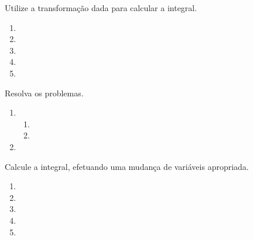 



	
	
	\vspace{5mm}
	
	Utilize a transformação dada para calcular a integral.
	
	\begin{enumerate}
		
		\item 
		\resposta{}
		
		\item 
		\resposta{}
		
		\item 
		\resposta{}
		
		\item 
		\resposta{}
		
		\item 
		\resposta{}
	
	\end{enumerate}
	
	\vspace{5mm}
	
	Resolva os problemas.
	
	\begin{enumerate}[resume]
		
		\item \begin{enumerate}

			\item 
			\resposta{}
			
			\item
			\resposta{}
			
		\end{enumerate}
		
		\item 
		\resposta{}
		
	\end{enumerate}
	
	\vspace{5mm}
	
	Calcule a integral, efetuando uma mudança de variáveis apropriada.
	
	\begin{enumerate}[resume]
	
		\item 
		\resposta{}
		
		\item 
		\resposta{}
		
		\item 
		\resposta{}
		
		\item 
		\resposta{}
		
		\item 
		\resposta{}
	
	\end{enumerate}
		
	\vspace{5mm}	
	
	


